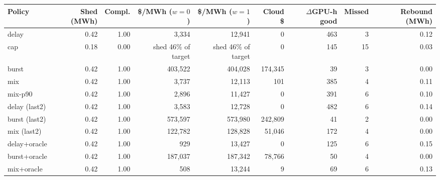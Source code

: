 \begin{tabular}{lrrrrrrrr}
\toprule
Policy & Shed (MWh) & Compl. & \$/MWh ($w{=}0$) & \$/MWh ($w{=}1$) & Cloud \$ & $\Delta$GPU-h good & Missed & Rebound (MWh) \\
\midrule
delay & 0.42 & 1.00 & 3,334 & 12,941 & 0 & 463 & 3 & 0.12 \\
cap & 0.18 & 0.00 & shed 46\% of target & shed 46\% of target & 0 & 145 & 15 & 0.03 \\
burst & 0.42 & 1.00 & 403,522 & 404,028 & 174,345 & 39 & 3 & 0.00 \\
mix & 0.42 & 1.00 & 3,737 & 12,113 & 101 & 385 & 4 & 0.11 \\
mix-p90 & 0.42 & 1.00 & 2,896 & 11,427 & 0 & 391 & 6 & 0.10 \\
delay (last2) & 0.42 & 1.00 & 3,583 & 12,728 & 0 & 482 & 6 & 0.14 \\
burst (last2) & 0.42 & 1.00 & 573,597 & 573,980 & 242,809 & 41 & 2 & 0.00 \\
mix (last2) & 0.42 & 1.00 & 122,782 & 128,828 & 51,046 & 172 & 4 & 0.00 \\
delay+oracle & 0.42 & 1.00 & 929 & 13,427 & 0 & 125 & 6 & 0.15 \\
burst+oracle & 0.42 & 1.00 & 187,037 & 187,342 & 78,766 & 50 & 4 & 0.00 \\
mix+oracle & 0.42 & 1.00 & 508 & 13,244 & 9 & 69 & 6 & 0.13 \\
\bottomrule
\end{tabular}

